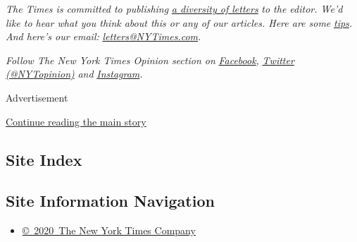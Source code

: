 \emph{The Times is committed to publishing}
\href{https://www.nytimes3xbfgragh.onion/2019/01/31/opinion/letters/letters-to-editor-new-york-times-women.html}{\emph{a
diversity of letters}} \emph{to the editor. We'd like to hear what you
think about this or any of our articles. Here are some}
\href{https://help.nytimes3xbfgragh.onion/hc/en-us/articles/115014925288-How-to-submit-a-letter-to-the-editor}{\emph{tips}}\emph{.
And here's our email:}
\href{mailto:letters@NYTimes.com}{\emph{letters@NYTimes.com}}\emph{.}

\emph{Follow The New York Times Opinion section on}
\href{https://www.facebookcorewwwi.onion/nytopinion}{\emph{Facebook}}\emph{,}
\href{http://twitter.com/NYTOpinion}{\emph{Twitter (@NYTopinion)}}
\emph{and}
\href{https://www.instagram.com/nytopinion/}{\emph{Instagram}}\emph{.}

Advertisement

\protect\hyperlink{after-bottom}{Continue reading the main story}

\hypertarget{site-index}{%
\subsection{Site Index}\label{site-index}}

\hypertarget{site-information-navigation}{%
\subsection{Site Information
Navigation}\label{site-information-navigation}}

\begin{itemize}
\tightlist
\item
  \href{https://help.nytimes3xbfgragh.onion/hc/en-us/articles/115014792127-Copyright-notice}{©~2020~The
  New York Times Company}
\end{itemize}

